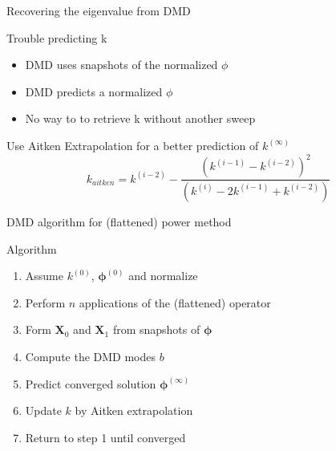 \documentclass[fleqn]{beamer}
\newcommand{\mat}[1]{\ensuremath{\bm{#1}}}
\renewcommand{\vec}[1]{\ensuremath{\bm{#1}}}
\begin{document}
\begin{frame}{Recovering the eigenvalue from DMD}
    \begin{block}{Trouble predicting k}
        \begin{itemize}
            \item DMD uses snapshots of the normalized $\phi$
            \item DMD predicts a normalized $\phi$
            \item No way to to retrieve k without another sweep
        \end{itemize}
    \end{block}
    \pause
    \begin{block}{Use Aitken Extrapolation for a better prediction of $k^{(\infty)}$ \footnotemark}
        \vspace*{-\baselineskip}\setlength\belowdisplayshortskip{0pt}
        \begin{equation*}
            k_{aitken} = k^{(i-2)} - \frac{(k^{(i-1)}-k^{(i-2)})^2}{(k^{(i)} - 2k^{(i-1)} + k^{(i-2)})}
        \end{equation*}
    \end{block}
\end{frame}

\begin{frame}{DMD algorithm for (flattened) power method}
    \begin{block}{Algorithm}
        \begin{enumerate}
            \item Assume $k^{(0)}$, $\vec\phi^{(0)}$ and normalize
            \pause
            \item Perform $n$ applications of the (flattened) operator
            \pause
            \item Form $\mat{X}_0$ and $\mat{X}_1$ from snapshots of $\vec\phi$
            \pause
            \item Compute the DMD modes $b$
            \pause
            \item Predict converged solution $\vec\phi^{(\infty)}$
            \pause
            \item Update $k$ by Aitken extrapolation
            \pause
            \item Return to step 1 until converged
        \end{enumerate}
    \end{block}
\end{frame}   
\end{document}
